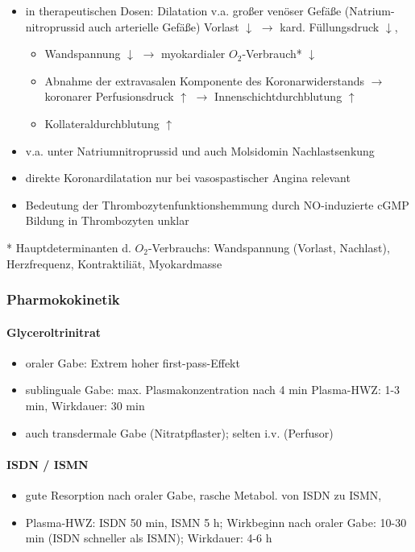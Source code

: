 \documentclass[10pt,a4paper]{report}
\begin{document}
\begin{itemize}
	\item in therapeutischen Dosen: Dilatation v.a. großer venöser Gefäße (Natrium-nitroprussid auch arterielle Gefäße)  Vorlast $\downarrow$ $\rightarrow$ kard. Füllungsdruck $\downarrow$,
	\begin{itemize}
		\item Wandspannung $\downarrow$ $\rightarrow$ myokardialer $O_2$-Verbrauch* $\downarrow$
		\item Abnahme der extravasalen Komponente des Koronarwiderstands $\rightarrow$ koronarer Perfusionsdruck $\uparrow$ $\rightarrow$ Innenschichtdurchblutung $\uparrow$
		\item Kollateraldurchblutung $\uparrow$
	\end{itemize}	 
	\item v.a. unter Natriumnitroprussid und auch Molsidomin Nachlastsenkung
	\item direkte Koronardilatation nur bei vasospastischer Angina relevant
	\item Bedeutung der Thrombozytenfunktionshemmung durch NO-induzierte cGMP Bildung in Thrombozyten unklar
\end{itemize}
* Hauptdeterminanten d. $O_2$-Verbrauchs: Wandspannung (Vorlast, Nachlast), Herzfrequenz, Kontraktiliät, Myokardmasse

\subsubsection{Pharmokokinetik}

\paragraph{Glyceroltrinitrat}   
\begin{itemize}
	\item oraler Gabe: 	Extrem hoher first-pass-Effekt
	\item sublinguale Gabe: max. Plasmakonzentration nach 4 min Plasma-HWZ: 1-3 min, Wirkdauer: 30 min
	\item auch transdermale Gabe (Nitratpflaster); selten i.v. (Perfusor)
\end{itemize}

\paragraph{ISDN / ISMN}
\begin{itemize}
	\item gute Resorption nach oraler Gabe, rasche Metabol. von ISDN zu ISMN, 
	\item Plasma-HWZ: ISDN 50 min, ISMN 5 h; Wirkbeginn nach oraler Gabe: 10-30 min (ISDN schneller als ISMN);  Wirkdauer: 4-6 h
\end{itemize}
\end{document}
